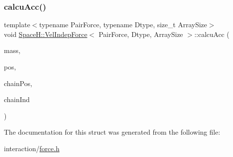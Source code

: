 \subsubsection{\texorpdfstring{calcu\+Acc()}{calcuAcc()}\hspace{0.1cm}{\footnotesize\ttfamily [2/2]}}
{\footnotesize\ttfamily template$<$typename Pair\+Force, typename Dtype, size\+\_\+t Array\+Size$>$ \\
void \mbox{\hyperlink{struct_space_h_1_1_vel_indep_force}{Space\+H\+::\+Vel\+Indep\+Force}}$<$ Pair\+Force, Dtype, Array\+Size $>$\+::calcu\+Acc (\begin{DoxyParamCaption}\item[{const \mbox{\hyperlink{struct_space_h_1_1_vel_indep_force_a05d04af454b5217024f5fff45d7e4d32}{Scalar\+Array}} \&}]{mass,  }\item[{const \mbox{\hyperlink{struct_space_h_1_1_vel_indep_force_a6b4e8ca988b015e7f956f015991ecd80}{Vector\+Array}} \&}]{pos,  }\item[{const \mbox{\hyperlink{struct_space_h_1_1_vel_indep_force_a6b4e8ca988b015e7f956f015991ecd80}{Vector\+Array}} \&}]{chain\+Pos,  }\item[{const \mbox{\hyperlink{struct_space_h_1_1_vel_indep_force_ac8dcda8c288da58df2f706259eeae0a9}{Index\+Array}} \&}]{chain\+Ind }\end{DoxyParamCaption})\hspace{0.3cm}{\ttfamily [inline]}}



The documentation for this struct was generated from the following file\+:\begin{DoxyCompactItemize}
\item 
interaction/\mbox{\hyperlink{force_8h}{force.\+h}}\end{DoxyCompactItemize}
